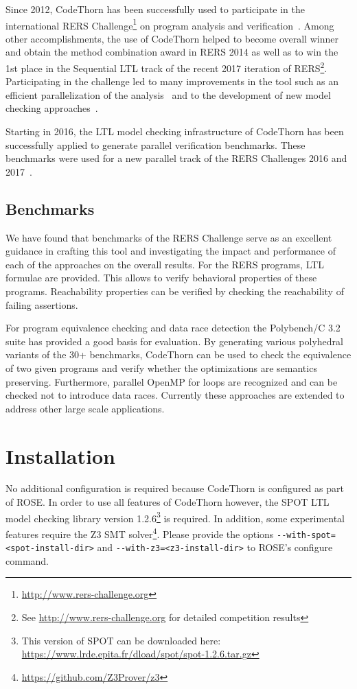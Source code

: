 \documentclass[natbib]{article}
\begin{document}
Since 2012, CodeThorn has been successfully used to participate in the
international RERS Challenge\footnote{\url{http://www.rers-challenge.org}} 
on program analysis and verification~\cite{schordan2014combining}.
Among other accomplishments, the use of CodeThorn helped to become overall winner and obtain the method
combination award in RERS 2014 as well as to win the 1st place in the Sequential LTL track of the 
recent 2017 iteration of RERS\footnote{See \url{http://www.rers-challenge.org} for detailed competition results}.
Participating in the challenge led to many improvements in the tool such as an efficient
parallelization of the analysis~\cite{jasper2016multi} and to the development of new model checking 
approaches~\cite{jasper2014counterexample}.

Starting in 2016, the LTL model checking infrastructure of CodeThorn has been successfully
applied to generate parallel verification benchmarks. These benchmarks were used for 
a new parallel track of the RERS Challenges 2016 and 2017~\cite{jasper2017rers}.


\subsection{Benchmarks}

We have found that benchmarks of the RERS Challenge
serve as an excellent guidance in crafting this tool and investigating
the impact and performance of each of the approaches on the overall
results. For the RERS programs, LTL formulae are
provided. This allows to verify behavioral properties of these
programs. Reachability properties can be verified by checking the
reachability of failing assertions.

For program equivalence checking and data race detection the
Polybench/C 3.2 suite has provided a good basis for evaluation. By
generating various polyhedral variants of the 30+ benchmarks, CodeThorn
can be used to check the equivalence of two given programs and verify
whether the optimizations are semantics preserving. 
Furthermore,
parallel OpenMP for loops are recognized and can be checked not to
introduce data races. Currently these approaches are extended to
address other large scale applications.

\section{Installation}

No additional configuration is required because
CodeThorn is configured as part of ROSE. In order to use all features of CodeThorn however,
the SPOT LTL model checking library version 1.2.6\footnote{This version of SPOT can be downloaded here: 
\url{https://www.lrde.epita.fr/dload/spot/spot-1.2.6.tar.gz}} is required. In addition, some
experimental features require the Z3 SMT 
solver\footnote{\url{https://github.com/Z3Prover/z3}}. Please provide the options
\verb+--with-spot=<spot-install-dir>+ and \verb+--with-z3=<z3-install-dir>+ to ROSE's configure command.
\end{document}
